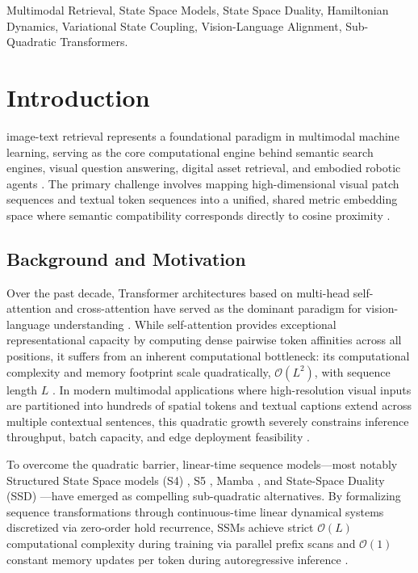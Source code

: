\documentclass[11pt,journal,onecolumn,draftcls]{IEEEtran}
\begin{document}
\begin{IEEEkeywords}
Multimodal Retrieval, State Space Models, State Space Duality, Hamiltonian Dynamics, Variational State Coupling, Vision-Language Alignment, Sub-Quadratic Transformers.
\end{IEEEkeywords}

\section{Introduction}
\label{sec:introduction}
 image-text retrieval represents a foundational paradigm in multimodal machine learning, serving as the core computational engine behind semantic search engines, visual question answering, digital asset retrieval, and embodied robotic agents \cite{radford2021learning,li2022blip,jia2021scaling}. The primary challenge involves mapping high-dimensional visual patch sequences and textual token sequences into a unified, shared metric embedding space where semantic compatibility corresponds directly to cosine proximity \cite{faghri2017vse++,lee2018stacked}.

\subsection{Background and Motivation}
Over the past decade, Transformer architectures based on multi-head self-attention and cross-attention have served as the dominant paradigm for vision-language understanding \cite{vaswani2017attention,dosovitskiy2020image,liu2019roberta}. While self-attention provides exceptional representational capacity by computing dense pairwise token affinities across all positions, it suffers from an inherent computational bottleneck: its computational complexity and memory footprint scale quadratically, $\mathcal{O}(L^2)$, with sequence length $L$ \cite{dao2022flashattention}. In modern multimodal applications where high-resolution visual inputs are partitioned into hundreds of spatial tokens and textual captions extend across multiple contextual sentences, this quadratic growth severely constrains inference throughput, batch capacity, and edge deployment feasibility \cite{li2023blip2,wang2023image}.

To overcome the quadratic barrier, linear-time sequence models---most notably Structured State Space models (S4) \cite{gu2021efficiently}, S5 \cite{smith2022simplified}, Mamba \cite{gu2023mamba}, and State-Space Duality (SSD) \cite{dao2024transformers}---have emerged as compelling sub-quadratic alternatives. By formalizing sequence transformations through continuous-time linear dynamical systems discretized via zero-order hold recurrence, SSMs achieve strict $\mathcal{O}(L)$ computational complexity during training via parallel prefix scans and $\mathcal{O}(1)$ constant memory updates per token during autoregressive inference \cite{gu2020hippo,smith2022simplified}.
\end{document}
